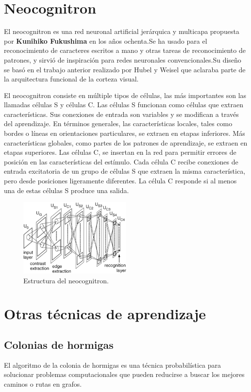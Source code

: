 \documentclass[a4paper, 11pt]{article} %
\begin{document}
\section{Neocognitron}
El neocognitron es una red neuronal artificial jerárquica y multicapa propuesta por \textbf{Kunihiko Fukushima} en los años ochenta.Se ha usado para el reconocimiento de caracteres escritos a mano y otras tareas de reconocimiento de patrones, y sirvió de inspiración para redes neuronales convencionales.Su diseño se basó en el trabajo anterior realizado por Hubel y Weisel que aclaraba parte de la arquitectura funcional de la corteza visual.

El neocognitron consiste en múltiple tipos de células, las más importantes son las llamadas células S y células C. Las células S funcionan como células que extraen características. Sus conexiones de entrada son variables y se modifican a través del aprendizaje. En términos generales, las características locales, tales como bordes o líneas en orientaciones particulares, se extraen en etapas inferiores. Más características globales, como partes de los patrones de aprendizaje, se extraen en etapas superiores.
Las células C, se insertan en la red para permitir errores de posición en las características del estímulo. Cada célula C recibe conexiones de entrada excitatoria de un grupo de células S que extraen la misma característica, pero desde posiciones ligeramente diferentes. La célula C responde si al menos una de estas células S produce una salida.

\begin{figure}[H]
	\centering
	\includegraphics[width=0.5\textwidth]{neocognitron1.png}
	\caption{Estructura del neocognitron.}
	\label{Estructura del neocognitron.}
\end{figure}

\section{Otras técnicas de aprendizaje}

\subsection{Colonias de hormigas}
El algoritmo de la colonia de hormigas es una técnica probabilística para solucionar problemas computacionales que pueden reducirse a buscar los mejores caminos o rutas en grafos.
\end{document}
